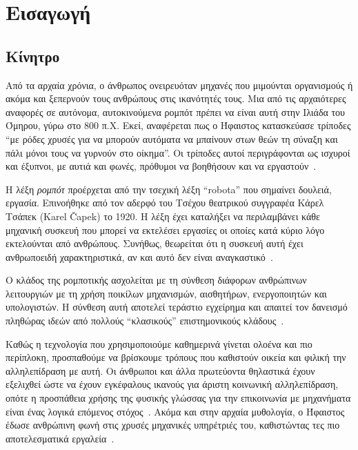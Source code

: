 \chapter{Εισαγωγή}\label{chap:intro}

\section{Κίνητρο}\label{sec:motivation}
Από τα αρχαία χρόνια, ο άνθρωπος ονειρευόταν μηχανές που μιμούνται οργανισμούς ή ακόμα και ξεπερνούν τους ανθρώπους στις ικανότητές τους.
Μια από τις αρχαιότερες αναφορές σε αυτόνομα, αυτοκινούμενα ρομπότ πρέπει να είναι αυτή στην Ιλιάδα του Όμηρου, γύρω στο 800 π.Χ.
Εκεί, αναφέρεται πως ο Ήφαιστος κατασκεύασε τρίποδες \enquote{με ρόδες χρυσές για να μπορούν αυτόματα να μπαίνουν στων θεών τη σύναξη και πάλι μόνοι τους να γυρνούν στο οίκημα}.
Οι τρίποδες αυτοί περιγράφονται ως ισχυροί και έξυπνοι, με αυτιά και φωνές, πρόθυμοι να βοηθήσουν και να εργαστούν~\cite{graefe2009ancient}.

Η λέξη \emph{ρομπότ} προέρχεται από την τσεχική λέξη \enquote{robota} που σημαίνει δουλειά, εργασία.
Επινοήθηκε από τον αδερφό του Τσέχου θεατρικού συγγραφέα Κάρελ Τσάπεκ (Karel Čapek) το 1920.
Η λέξη έχει καταλήξει να περιλαμβάνει κάθε μηχανική συσκευή που μπορεί να εκτελέσει εργασίες οι οποίες κατά κύριο λόγο εκτελούνται από ανθρώπους.
Συνήθως, θεωρείται ότι η συσκευή αυτή έχει ανθρωποειδή χαρακτηριστικά, αν και αυτό δεν είναι αναγκαστικό~\cite{asimov1989asimov}.

Ο κλάδος της ρομποτικής ασχολείται με τη σύνθεση διάφορων ανθρώπινων λειτουργιών με τη χρήση ποικίλων μηχανισμών, αισθητήρων, ενεργοποιητών και υπολογιστών.
Η σύνθεση αυτή αποτελεί τεράστιο εγχείρημα και απαιτεί τον δανεισμό πληθώρας ιδεών από πολλούς \enquote{κλασικούς} επιστημονικούς κλάδους~\cite{craig2009introduction}.

Καθώς η τεχνολογία που χρησιμοποιούμε καθημερινά γίνεται ολοένα και πιο περίπλοκη, προσπαθούμε να βρίσκουμε τρόπους που καθιστούν οικεία και φιλική την αλληλεπίδραση με αυτή.
Οι άνθρωποι και άλλα πρωτεύοντα θηλαστικά έχουν εξελιχθεί ώστε να έχουν εγκέφαλους ικανούς για άριστη κοινωνική αλληλεπίδραση,
οπότε η προσπάθεια χρήσης της φυσικής γλώσσας για την επικοινωνία με μηχανήματα είναι ένας λογικά επόμενος στόχος~\cite{dunbar2007evolution,breazeal2004designing}.
Ακόμα και στην αρχαία μυθολογία, ο Ήφαιστος έδωσε ανθρώπινη φωνή στις χρυσές μηχανικές υπηρέτριές του, καθιστώντας τες πιο αποτελεσματικά εργαλεία~\cite{gera2003ancient}.

